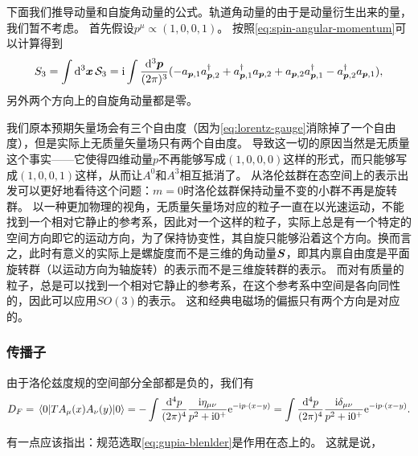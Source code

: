 下面我们推导动量和自旋角动量的公式。轨道角动量的由于是动量衍生出来的量，我们暂不考虑。
首先假设$p^\mu \propto (1, 0, 0, 1)$。
按照\eqref{eq:spin-angular-momentum}可以计算得到
\[
    {S}_3 = \int \dd[3]{\vb*{x}} \mathcal{S}_3 = \mathrm{i} \int \frac{\dd[3]{\vb*{p}}}{(2\pi)^3} (- {a}_{\vb*{p},1} {a}^\dagger_{\vb*{p}, 2} + {a}^\dagger_{\vb*{p}, 1} {a}_{\vb*{p}, 2} + {a}_{\vb*{p}, 2} {a}_{\vb*{p}, 1}^\dagger - {a}_{\vb*{p}, 2}^\dagger {a}_{\vb*{p}, 1} ) ,
\]
另外两个方向上的自旋角动量都是零。

我们原本预期矢量场会有三个自由度（因为\eqref{eq:lorentz-gauge}消除掉了一个自由度），但是实际上无质量矢量场只有两个自由度。
导致这一切的原因当然是无质量这个事实——它使得四维动量$p$不再能够写成$(1, 0, 0, 0)$这样的形式，而只能够写成$(1,0,0,1)$这样，从而让$A^0$和$A^3$相互抵消了。
从洛伦兹群在态空间上的表示出发可以更好地看待这个问题：$m=0$时洛伦兹群保持动量不变的小群不再是旋转群。
以一种更加物理的视角，无质量矢量场对应的粒子一直在以光速运动，不能找到一个相对它静止的参考系，因此对一个这样的粒子，实际上总是有一个特定的空间方向即它的运动方向，为了保持协变性，其自旋只能够沿着这个方向。换而言之，此时有意义的实际上是螺旋度而不是三维的角动量${\vb*{S}}$，即其内禀自由度是平面旋转群（以运动方向为轴旋转）的表示而不是三维旋转群的表示。
而对有质量的粒子，总是可以找到一个相对它静止的参考系，在这个参考系中空间是各向同性的，因此可以应用$SO(3)$的表示。
这和经典电磁场的偏振只有两个方向是对应的。



\subsubsection{传播子}

由于洛伦兹度规的空间部分全部都是负的，我们有
\begin{equation}
    D_F = \mel*{0}{T A_{\mu}(x) A_{\nu}(y)}{0} = - \int \frac{\dd[4]{p}}{(2\pi)^4} \frac{\mathrm{i} \eta_{\mu \nu}}{p^2 + \mathrm{i} 0^+} \mathrm{e}^{- \mathrm{i} p \cdot (x - y)} = \int \frac{\dd[4]{p}}{(2\pi)^4} \frac{\mathrm{i} \delta_{\mu \nu}}{p^2 + \mathrm{i} 0^+} \mathrm{e}^{- \mathrm{i} p \cdot (x - y)}.
\end{equation}

有一点应该指出：规范选取\eqref{eq:gupia-blenlder}是作用在态上的。
这就是说，%

